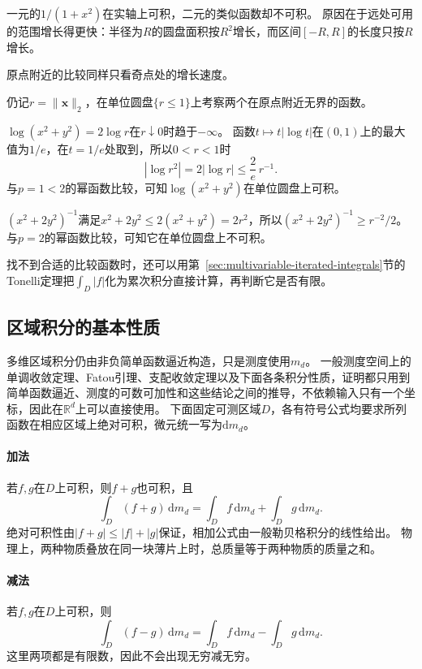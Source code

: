 一元的$1/(1+x^2)$在实轴上可积，二元的类似函数却不可积。
原因在于远处可用的范围增长得更快：半径为$R$的圆盘面积按$R^2$增长，而区间$[-R,R]$的长度只按$R$增长。

原点附近的比较同样只看奇点处的增长速度。
\begin{example}[原点附近的对数奇点与平方倒数奇点]
\label{ex:region-comparison-near-origin}
仍记$r=\lVert\bm x\rVert_2$，在单位圆盘$\{r\leq1\}$上考察两个在原点附近无界的函数。

$\log(x^2+y^2)=2\log r$在$r\downarrow0$时趋于$-\infty$。
函数$t\mapsto t|\log t|$在$(0,1)$上的最大值为$1/e$，在$t=1/e$处取到，所以$0<r<1$时
\[
 |\log r^2|=2|\log r|\leq\frac2e\,r^{-1}.
\]
与$p=1<2$的幂函数比较，可知$\log(x^2+y^2)$在单位圆盘上可积。

$(x^2+2y^2)^{-1}$满足$x^2+2y^2\leq2(x^2+y^2)=2r^2$，所以$(x^2+2y^2)^{-1}\geq r^{-2}/2$。
与$p=2$的幂函数比较，可知它在单位圆盘上不可积。
\end{example}

找不到合适的比较函数时，还可以用第~\ref{sec:multivariable-iterated-integrals}节的Tonelli定理把$\int_D|f|$化为累次积分直接计算，再判断它是否有限。

\subsection{区域积分的基本性质}

多维区域积分仍由非负简单函数逼近构造，只是测度使用$m_d$。
一般测度空间上的单调收敛定理、Fatou引理、支配收敛定理以及下面各条积分性质，证明都只用到简单函数逼近、测度的可数可加性和这些结论之间的推导，不依赖输入只有一个坐标，因此在$\mathbb R^d$上可以直接使用。
下面固定可测区域$D$，各有符号公式均要求所列函数在相应区域上绝对可积，微元统一写为$\mathrm dm_d$。

\paragraph{加法}

若$f,g$在$D$上可积，则$f+g$也可积，且
\[
 \int_D(f+g)\,\mathrm dm_d=\int_Df\,\mathrm dm_d+\int_Dg\,\mathrm dm_d.
\]
绝对可积性由$|f+g|\leq|f|+|g|$保证，相加公式由一般勒贝格积分的线性给出。
物理上，两种物质叠放在同一块薄片上时，总质量等于两种物质的质量之和。

\paragraph{减法}

若$f,g$在$D$上可积，则
\[
 \int_D(f-g)\,\mathrm dm_d=\int_Df\,\mathrm dm_d-\int_Dg\,\mathrm dm_d.
\]
这里两项都是有限数，因此不会出现无穷减无穷。

